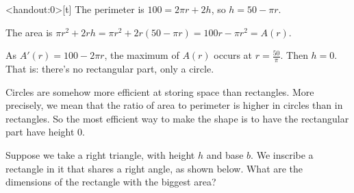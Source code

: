\begin{frame}<handout:0>[t]
\color{answercolor}
The perimeter is $100=2\pi r + 2h$, so
$h=50-\pi r$.

The area is
$\pi r^2 + 2rh = \pi r^2+2r(50-\pi r) =100r-\pi r^2=A(r)$.

\medskip 

As $A'(r)=100-2\pi r$, the maximum of $A(r)$ occurs at $r=\frac{50}{\pi}$. Then
$h=0$. That is: there's no rectangular part, only a circle.

\medskip

Circles are somehow more efficient at storing space than rectangles. More precisely, we mean that the ratio of area to perimeter is higher in circles 
than in rectangles. So the most efficient way to make the shape is to have the rectangular part have height 0.
\end{frame}
\begin{frame}[t]
Suppose we take a right triangle, with height $h$ and base $b$. We inscribe a rectangle in it that shares a right angle, as shown below. What are the dimensions of the rectangle with the biggest area?

\begin{center}
\end{center}
\vfill
\end{frame}

